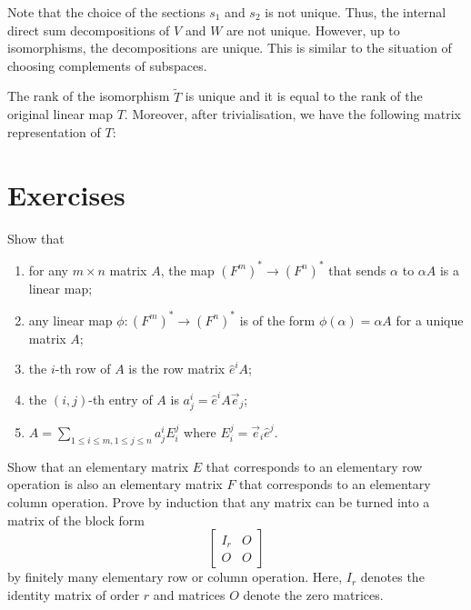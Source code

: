 \begin{remark}
  Note that the choice of the sections $s_1$ and $s_2$ is not unique. Thus, the internal direct sum decompositions of $V$ and $W$ are not unique. However, up to isomorphisms, the decompositions are unique. This is similar to the situation of choosing complements of subspaces.
\end{remark}

The rank of the isomorphism $\widetilde{T}$ is unique and it is equal to the rank of the original linear map $T$. Moreover, after trivialisation, we have the following matrix representation of $T$:
\begin{center}
\end{center}

\clearpage{}

\section{Exercises}

\begin{problem}
Show that
\begin{enumerate}
  \item for any $m \times n$ matrix $A$, the map ${(F^m)}^* \to {(F^n)}^*$ that sends $\alpha$ to $\alpha A$ is a linear map;
  \item any linear map $\phi \colon {(F^m)}^* \to {(F^n)}^*$ is of the form $\phi(\alpha) = \alpha A$ for a unique matrix $A$;
  \item the $i$-th row of $A$ is the row matrix $\hat{e}^i A$;
  \item the $(i, j)$-th entry of $A$ is $a^i_j = \hat{e}^i A \vec{e}_j$;
  \item $A = \sum_{1 \leq i \leq m, 1 \leq j \leq n} a^i_j E_i^j$ where $E_i^j = \vec{e}_i \hat{e}^j$.
\end{enumerate}
\end{problem}

\begin{problem}
Show that an elementary matrix $E$ that corresponds to an elementary row operation is also an elementary matrix $F$ that corresponds to an elementary column operation. Prove by induction that any matrix can be turned into a matrix of the block form
\[ \begin{bmatrix} I_r & O \\ O & O \end{bmatrix} \]
by finitely many elementary row or column operation. Here, $I_r$ denotes the identity matrix of order $r$ and matrices $O$ denote the zero matrices.
\end{problem}

